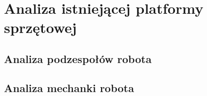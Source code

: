 \section{Analiza istniejącej platformy sprzętowej}
\subsection{Analiza podzespołów robota}
\subsection{Analiza mechanki robota}